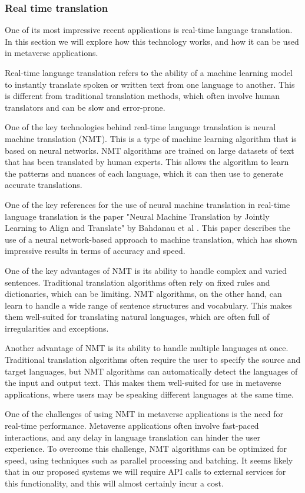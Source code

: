 \subsubsection{Real time translation}
One of its most impressive recent applications is real-time language translation. In this section we will explore how this technology works, and how it can be used in metaverse applications.\par
Real-time language translation refers to the ability of a machine learning model to instantly translate spoken or written text from one language to another. This is different from traditional translation methods, which often involve human translators and can be slow and error-prone.\par
One of the key technologies behind real-time language translation is neural machine translation (NMT). This is a type of machine learning algorithm that is based on neural networks. NMT algorithms are trained on large datasets of text that has been translated by human experts. This allows the algorithm to learn the patterns and nuances of each language, which it can then use to generate accurate translations.\par
One of the key references for the use of neural machine translation in real-time language translation is the paper "Neural Machine Translation by Jointly Learning to Align and Translate" by Bahdanau et al \cite{bahdanau2014neural}. This paper describes the use of a neural network-based approach to machine translation, which has shown impressive results in terms of accuracy and speed.\par
One of the key advantages of NMT is its ability to handle complex and varied sentences. Traditional translation algorithms often rely on fixed rules and dictionaries, which can be limiting. NMT algorithms, on the other hand, can learn to handle a wide range of sentence structures and vocabulary. This makes them well-suited for translating natural languages, which are often full of irregularities and exceptions.\par
Another advantage of NMT is its ability to handle multiple languages at once. Traditional translation algorithms often require the user to specify the source and target languages, but NMT algorithms can automatically detect the languages of the input and output text. This makes them well-suited for use in metaverse applications, where users may be speaking different languages at the same time.\par
One of the challenges of using NMT in metaverse applications is the need for real-time performance. Metaverse applications often involve fast-paced interactions, and any delay in language translation can hinder the user experience. To overcome this challenge, NMT algorithms can be optimized for speed, using techniques such as parallel processing and batching. It seems likely that in our proposed systems we will require API calls to external services for this functionality, and this will almost certainly incur a cost.\par
